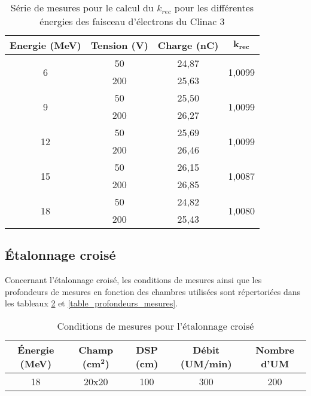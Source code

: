 \documentclass{article}
\begin{document}
\begin{table}[h]
  \centering
  \begin{tabular}{cccc}
  \toprule
  \textbf{Energie (MeV)} & \textbf{Tension (V)} & \textbf{Charge (nC)} & $\mathbf{k_{rec}}$ \\ \toprule
  \multirow{2}{*}{6} & 50 & 24,87 & \multirow{2}{*}{1,0099} \\
   &200 & 25,63 &  \\ \hline
  \multirow{2}{*}{9} & 50 & 25,50 & \multirow{2}{*}{1,0099} \\
   &200 & 26,27 &  \\ \hline
  \multirow{2}{*}{12} & 50 & 25,69 & \multirow{2}{*}{1,0099} \\
   &200 & 26,46 &  \\ \hline  \multirow{2}{*}{15} &50 & 26,15 & \multirow{2}{*}{1,0087} \\
   &200 & 26,85 &  \\ \hline
  \multirow{2}{*}{18} & 50 & 24,82 & \multirow{2}{*}{1,0080} \\
   & 200 & 25,43 &  \\ \bottomrule
  \end{tabular}
  \caption{Série de mesures pour le calcul du $k_{rec}$ pour les différentes énergies des faisceau d'électrons du Clinac 3}
  \label{table_krec}
\end{table}

\subsection{Étalonnage croisé}

Concernant l'étalonnage croisé, les conditions de mesures ainsi que les profondeurs de mesures en fonction des chambres utilisées sont répertoriées dans les tableaux \ref*{table_conditions_etal_croise} et \ref*{table_profondeurs_mesures}.

\begin{table}[h]
  \centering
  \begin{tabular}{ccccc}
    \toprule
    \textbf{Énergie (MeV)} & \textbf{Champ (cm}$\mathbf{^2}$\textbf{)} & \textbf{DSP (cm)} & \textbf{Débit (UM/min)} & \textbf{Nombre d'UM} \\
    \toprule
    18 & 20x20 & 100 & 300 & 200\\
    \bottomrule
  \end{tabular}
  \caption{Conditions de mesures pour l'étalonnage croisé}
  \label{table_conditions_etal_croise}
\end{table}
\end{document}

